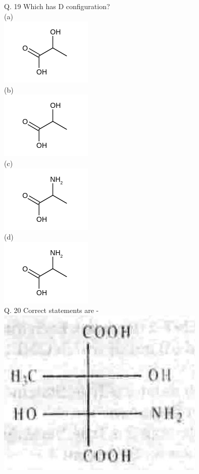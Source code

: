 \documentclass[10pt]{article}
\begin{document}
Q. 19 Which has D configuration?\\
(a)\\
\includegraphics{smile-e0ada2560d4fa6cea45e26ef808ed5d0954567a7}\\
(b)\\
\includegraphics{smile-9e8a96a81cb9d92a8fd35f87d319e1dd0844b9ec}\\
(c)\\
\includegraphics{smile-c0c9f3ad31cf039b5862b81bae11d8e0c8e81ab9}\\
(d)\\
\includegraphics{smile-934d176f00da17c5454070e0e3083d7127fdf954}\\
Q. 20 Correct statements are -\\
\includegraphics[max width=\textwidth, center]{2025_01_28_8470952b98110cec3aabg-147(1)}\\
\end{document}
